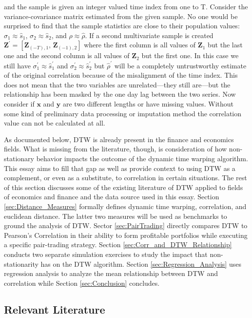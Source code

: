 and the sample is given an integer valued time index from one to T. Consider the variance-covariance matrix estimated from the given sample. No one would be surprised to find that the sample statistics are close to their population values: $\sigma_{1} \approx \hat{s}_{1}$, $\sigma_{2} \approx \hat{s}_{2}$, and $\rho \approx \hat{\rho}$. If a second multivariate sample is created $\boldsymbol{Z}^\prime = [\boldsymbol{Z}_{(-T), 1}, \, \boldsymbol{Z}_{(-1), 2}]$ where the first column is all values of $\boldsymbol{Z}_{1}$ but the last one and the second column is all values of $\boldsymbol{Z}_{2}$ but the first one. In this case we still have $\sigma^{\prime}_{1} \approx \hat{s}^{\prime}_{1}$ and $\sigma^{\prime}_{2} \approx \hat{s}^{\prime}_{2}$ but $\hat{\rho}^{\prime}$ will be a completely untrustworthy estimate of the original correlation because of the misalignment of the time index. This does not mean that the two variables are unrelated---they still are---but the relationship has been masked by the one day lag between the two series. Now consider if $\boldsymbol{x}$ and $\boldsymbol{y}$ are two different lengths or have missing values. Without some kind of preliminary data processing or imputation method the correlation value can not be calculated at all.

As documented below, DTW is already present in the finance and economics fields. What is missing from the literature, though, is consideration of how non-stationary behavior impacts the outcome of the dynamic time warping algorithm. This essay aims to fill that gap as well as provide context to using DTW as a complement, or even as a substitute, to correlation in certain situations. The rest of this section discusses some of the existing literature of DTW applied to fields of economics and finance and the data source used in this essay. Section \ref{sec:Distance_Measures} formally defines dynamic time warping, correlation, and euclidean distance. The latter two measures will be used as benchmarks to ground the analysis of DTW. Sector \ref{sec:PairTrading} directly compares DTW to Pearson's Correlation in their ability to form profitable portfolios while executing a specific pair-trading strategy. Section \ref{sec:Corr_and_DTW_Relationship} conducts two separate simulation exercises to study the impact that non-stationarity has on the DTW algorithm. Section \ref{sec:Regression_Analysis} uses regression analysis to analyze the mean relationship between DTW and correlation while Section \ref{sec:Conclusion} concludes.


\subsection{Relevant Literature}

